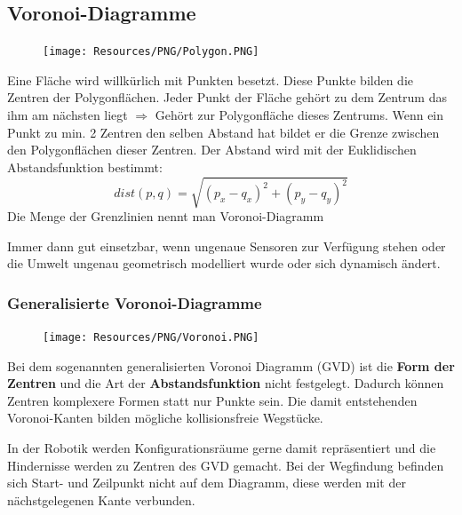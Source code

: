 \pagebreak
\subsection{Voronoi-Diagramme}
{
\begin{figure}
	\texttt{[image: Resources/PNG/Polygon.PNG]}
\end{figure}

Eine Fläche wird willkürlich mit Punkten besetzt. Diese Punkte bilden die
Zentren der Polygonflächen. Jeder Punkt der Fläche gehört zu dem Zentrum das
ihm am nächsten liegt $\Rightarrow$ Gehört zur Polygonfläche dieses Zentrums.
Wenn ein Punkt zu min. 2 Zentren den selben Abstand hat bildet er die Grenze
zwischen den Polygonflächen dieser Zentren. Der Abstand wird mit der
Euklidischen Abstandsfunktion bestimmt:
$$
	dist(p,q) = \sqrt{(p_x - q_x)^2 + (p_y - q_y)^2}
$$
Die Menge der Grenzlinien nennt man Voronoi-Diagramm

}

Immer dann gut einsetzbar, wenn ungenaue Sensoren zur Verfügung stehen oder die
Umwelt ungenau geometrisch modelliert wurde oder sich dynamisch ändert.

\subsubsection{Generalisierte Voronoi-Diagramme}
{
\begin{figure}
	\vspace{-1cm}
	\centering
	\texttt{[image: Resources/PNG/Voronoi.PNG]}
\end{figure}
Bei dem sogenannten generalisierten Voronoi Diagramm (GVD) ist die \textbf{
Form der Zentren} und die Art der \textbf{Abstandsfunktion} nicht festgelegt.
Dadurch können Zentren komplexere Formen statt nur Punkte sein. Die damit
entstehenden Voronoi-Kanten bilden mögliche kollisionsfreie Wegstücke.

In der Robotik werden Konfigurationsräume gerne damit repräsentiert und die
Hindernisse werden zu Zentren des GVD gemacht. Bei der Wegfindung befinden sich
Start- und Zeilpunkt nicht auf dem Diagramm, diese werden mit der
nächstgelegenen Kante verbunden.

}

